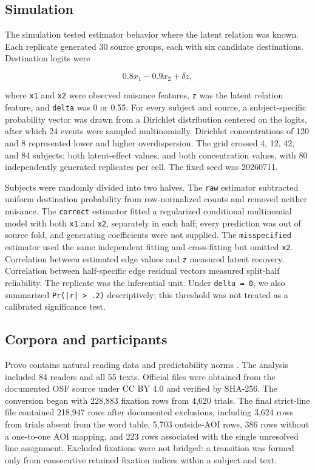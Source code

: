 \documentclass[11pt]{article}
\begin{document}
\subsection{Simulation}

The simulation tested estimator behavior where the latent relation was known. Each replicate generated 30 source groups, each with six candidate destinations. Destination logits were

\[0.8x_1 - 0.9x_2 + \delta z,\]

where \texttt{x1} and \texttt{x2} were observed nuisance features, \texttt{z} was the latent relation feature, and \texttt{delta} was 0 or 0.55. For every subject and source, a subject-specific probability vector was drawn from a Dirichlet distribution centered on the logits, after which 24 events were sampled multinomially. Dirichlet concentrations of 120 and 8 represented lower and higher overdispersion. The grid crossed 4, 12, 42, and 84 subjects; both latent-effect values; and both concentration values, with 80 independently generated replicates per cell. The fixed seed was 20260711.

Subjects were randomly divided into two halves. The \texttt{raw} estimator subtracted uniform destination probability from row-normalized counts and removed neither nuisance. The \texttt{correct} estimator fitted a regularized conditional multinomial model with both \texttt{x1} and \texttt{x2}, separately in each half; every prediction was out of source fold, and generating coefficients were not supplied. The \texttt{misspecified} estimator used the same independent fitting and cross-fitting but omitted \texttt{x2}. Correlation between estimated edge values and \texttt{z} measured latent recovery. Correlation between half-specific edge residual vectors measured split-half reliability. The replicate was the inferential unit. Under \texttt{delta = 0}, we also summarized \texttt{Pr(|r| > .2)} descriptively; this threshold was not treated as a calibrated significance test.

\subsection{Corpora and participants}

Provo contains natural reading data and predictability norms \citep{luke2018}. The analysis included 84 readers and all 55 texts. Official files were obtained from the documented OSF source under CC BY 4.0 and verified by SHA-256. The conversion began with 228,883 fixation rows from 4,620 trials. The final strict-line file contained 218,947 rows after documented exclusions, including 3,624 rows from trials absent from the word table, 5,703 outside-AOI rows, 386 rows without a one-to-one AOI mapping, and 223 rows associated with the single unresolved line assignment. Excluded fixations were not bridged: a transition was formed only from consecutive retained fixation indices within a subject and text.
\end{document}
